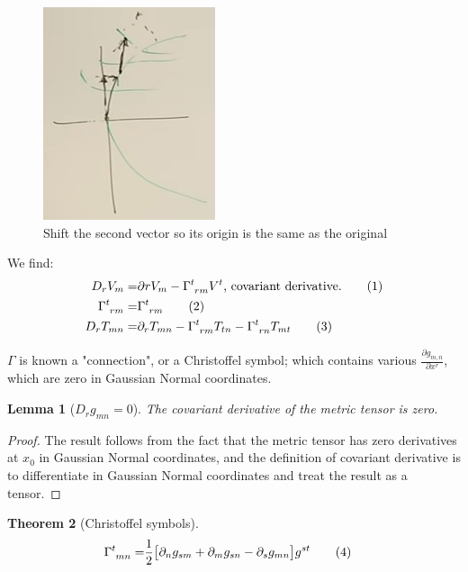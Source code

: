 \documentclass[]{article}
\newcommand\numberthis{\addtocounter{equation}{1}\tag{\theequation}}
\newtheorem{thm}{Theorem}
\newtheorem{lemma}[thm]{Lemma}
\begin{document}
\begin{figure}[H]
	\begin{center}
		\caption{Shift the second vector so its origin is the same as the original}\label{fig:gr-4-equality-of-vectors-revised}
		\includegraphics{gr-4-equality-of-vectors-revised}
	\end{center}
\end{figure}

We find:
\begin{align*}
	D_r V_m =& \partial r V_{m} - \Gamma\indices{^t_{rm}} V^t \text{, covariant derivative.} \numberthis \label{eq:covariant_1}\\
	\Gamma\indices{^t_{rm}} =& \Gamma\indices{^t_{rm}}\numberthis \label{eq:symmetry:Gamma}\\
	D_r T_{mn} =& \partial_r T_{mn} - \Gamma\indices{^t_{rm}} T_{tn} - \Gamma\indices{^t_{rn}} T_{mt} \numberthis \label{eq:covariant_2}
\end{align*}

$\Gamma$ is known a "connection", or a Christoffel symbol; which contains various $\frac{\partial g_{m,n}}{\partial x^r}$, which are zero in Gaussian Normal coordinates.

\begin{lemma}[$D_r g_{mn}=0$]\label{thm:covariant_derivative:metric}
	The covariant derivative of the metric tensor is zero.
\end{lemma}

\begin{proof}
	The result follows from the fact that the metric tensor has zero derivatives at $x_0$ in Gaussian Normal coordinates, and the definition of covariant derivative is to differentiate in Gaussian Normal coordinates and treat the result as a tensor.
\end{proof}

\begin{thm}[Christoffel symbols]
	\begin{align*}
		\Gamma\indices{^t_{mn}} =& \frac{1}{2}\big[\partial_n g_{sm} + \partial_m g_{sn}- \partial_s g_{mn}\big]  g^{st}   \numberthis \label{eq:christoffel}
	\end{align*}
\end{thm}
\end{document}

